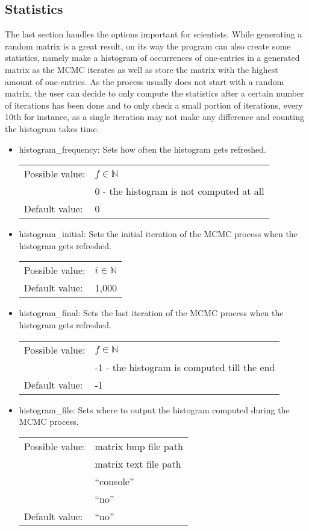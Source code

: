 \subsection{Statistics}
The last section handles the options important for scientists. While generating a random matrix is a great result, on its way the program can also create some statistics, namely make a histogram of occurrences of one-entries in a generated matrix as the MCMC iterates as well as store the matrix with the highest amount of one-entries. As the process usually does not start with a random matrix, the user can decide to only compute the statistics after a certain number of iterations has been done and to only check a small portion of iterations, every 10th for instance, as a single iteration may not make any difference and counting the histogram takes time.
\begin{itemize}
\item histogram\_frequency: Sets how often the histogram gets refreshed.

\begin{tabular}{ll}
Possible value: & $f\in\mathbb{N}$ \\
& 0 - the histogram is not computed at all \\
Default value: & 0
\end{tabular}

\item histogram\_initial: Sets the initial iteration of the MCMC process when the histogram gets refreshed.

\begin{tabular}{ll}
Possible value: & $i\in\mathbb{N}$ \\
Default value: & 1,000
\end{tabular}

\item histogram\_final: Sets the last iteration of the MCMC process when the histogram gets refreshed.

\begin{tabular}{ll}
Possible value: & $f\in\mathbb{N}$ \\
& -1 - the histogram is computed till the end \\
Default value: & -1
\end{tabular}

\item histogram\_file: Sets where to output the histogram computed during the MCMC process.

\begin{tabular}{ll}
Possible value: & matrix bmp file path \\
& matrix text file path \\
& ``console'' \\
& ``no'' \\
Default value: & ``no''
\end{tabular}


\end{itemize}

